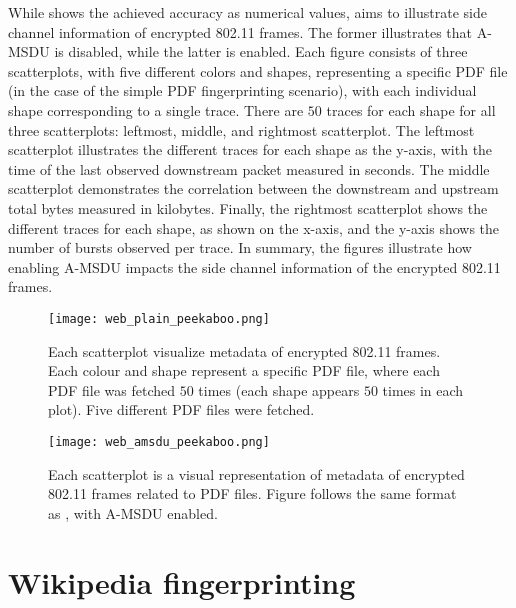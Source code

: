 While  shows the achieved accuracy as numerical values,  aims to illustrate side channel information of encrypted 802.11 frames. The former illustrates that A-MSDU is disabled, while the latter is enabled. Each figure consists of three scatterplots, with five different colors and shapes, representing a specific PDF file (in the case of the simple PDF fingerprinting scenario), with each individual shape corresponding to a single trace. There are $50$ traces for each shape for all three scatterplots: leftmost, middle, and rightmost scatterplot. The leftmost scatterplot illustrates the different traces for each shape as the y-axis, with the time of the last observed downstream packet measured in seconds. The middle scatterplot demonstrates the correlation between the downstream and upstream total bytes measured in kilobytes. Finally, the rightmost scatterplot shows the different traces for each shape, as shown on the x-axis, and the y-axis shows the number of bursts observed per trace. In summary, the figures illustrate how enabling A-MSDU impacts the side channel information of the encrypted 802.11 frames.

\begin{figure}
	\centering
        \texttt{[image: web\_plain\_peekaboo.png]}
        \caption{Each scatterplot visualize metadata of encrypted 802.11 frames. Each colour and shape represent a specific PDF file, where each PDF file was fetched $50$ times (each shape appears $50$ times in each plot). Five different PDF files were fetched.}
    \label{fig:web_plain_peekaboo}
\end{figure}

\begin{figure}
	\centering
        \texttt{[image: web\_amsdu\_peekaboo.png]}
           \caption{Each scatterplot is a visual representation of metadata of encrypted 802.11 frames related to PDF files. Figure follows the same format as , with A-MSDU enabled.}
    \label{fig:web_amsdu_peekaboo}
\end{figure}

\clearpage

\section{Wikipedia fingerprinting\label{sec:result2-result}}

